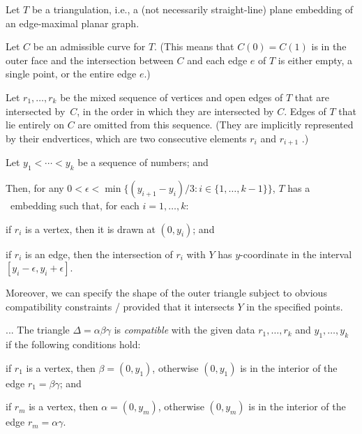 \begin{thm}

	\begin{compactenum}
        \item Let $T$ be a triangulation,
          i.e.,
          a (not necessarily straight-line)
plane embedding of an edge-maximal planar graph.
		\item Let $C$ be an admissible curve for $T$.
(This means that $C(0)=C(1)$ is in the outer face and the intersection between $C$ and each edge $e$ of $T$ is
either empty, a single point, or the entire edge $e$.)                  
\item Let $r_1,\ldots,r_k$ be the mixed sequence of vertices and open edges
  of $T$ that are intersected by~$C$, in the order in
  which they are intersected by $C$. Edges of $T$ that
  lie entirely on $C$
are omitted from this sequence.
(They are implicitly represented by their endvertices, which are two consecutive elements $r_i$ and $r_{i+1}$ .)
		\item Let $y_1<\cdots<y_k$ be a sequence of numbers; and
	\end{compactenum}
	Then, for any
        $0<\epsilon<\min\{(y_{i+1}-y_i)/3:i\in\{1,\ldots,k-1\}\}$, $T$
        has a \Fary\ embedding such that,
        for each $i=1,\ldots,k$: 
	\begin{compactenum}
		\item if $r_i$ is a vertex, then it is drawn at $(0,y_i)$; and
		\item if $r_i$ is an edge, then the intersection of $r_i$ with $Y$ has $y$-coordinate in the interval $[y_i-\epsilon,y_i+\epsilon]$.
\end{compactenum}

Moreover, we can specify the shape of the outer triangle
subject to
obvious compatibility constraints
/ provided that it intersects $Y$ in the specified points.
                
\end{thm}

...
The triangle $\Delta=\alpha\beta\gamma$ is \emph{compatible} with the
given data $r_1,\ldots,r_k$ and $y_1,\ldots,y_k$ if the following conditions hold:
\begin{compactenum}
	\item if $r_1$ is a vertex, then $\beta=(0,y_1)$, otherwise $(0, y_1)$ is in the interior of the edge $r_1=\beta\gamma$; and
	\item if $r_m$ is a vertex, then $\alpha=(0,y_m)$, otherwise $(0,y_m)$ is in the interior
	of the edge $r_m=\alpha\gamma$.
\end{compactenum}


